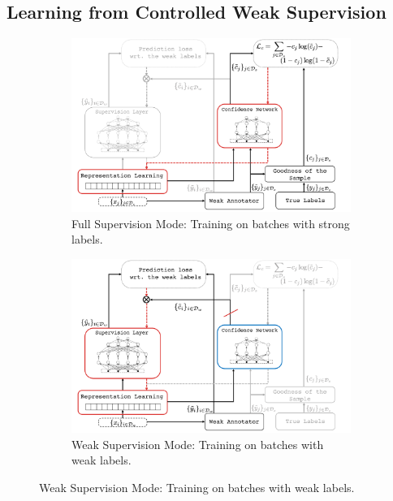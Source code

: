 \subsection{Learning from Controlled Weak Supervision}
\label{sec:method}
\begin{figure}[!htbp]%
    \centering
    \begin{subfigure}[t]{\textwidth}
        \centering
        \includegraphics[width=\textwidth]{03-part-02/chapter-05/figs_and_tables/fig_cws_train_v.pdf}
        \caption{\label{fig:train_u}\footnotesize{Full Supervision Mode: Training on batches with strong labels.}}
    \end{subfigure}%
    \vfill
    \vspace{20pt}
    \begin{subfigure}[t]{\textwidth}
        \centering
        \includegraphics[width=\textwidth]{03-part-02/chapter-05/figs_and_tables/fig_cws_train_u.pdf}
        \caption{\label{fig:train_v}\footnotesize{Weak Supervision Mode: Training on batches with weak labels.}}

\end{subfigure}
\end{figure}
